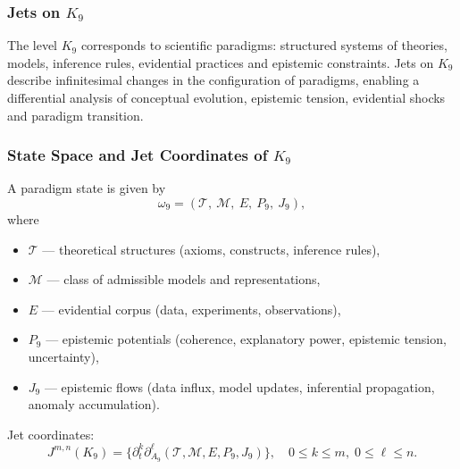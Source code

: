 
\subsubsection{Jets on \texorpdfstring{$K_9$}{K_9}}
\label{sec:jets-k9}

The level $K_9$ corresponds to scientific paradigms: structured systems
of theories, models, inference rules, evidential practices and epistemic
constraints. Jets on $K_9$ describe infinitesimal changes in the
configuration of paradigms, enabling a differential analysis of
conceptual evolution, epistemic tension, evidential shocks and paradigm
transition.


\subsubsection{State Space and Jet Coordinates of \texorpdfstring{$K_9$}{K_9}}

A paradigm state is given by
\[
\omega_9 = 
(\mathcal{T},\ \mathcal{M},\ E,\ P_9,\ J_9),
\]
where
\begin{itemize}
    \item $\mathcal{T}$ — theoretical structures (axioms, constructs, 
          inference rules),
    \item $\mathcal{M}$ — class of admissible models and representations,
    \item $E$ — evidential corpus (data, experiments, observations),
    \item $P_9$ — epistemic potentials (coherence, explanatory power,
          epistemic tension, uncertainty),
    \item $J_9$ — epistemic flows (data influx, model updates,
          inferential propagation, anomaly accumulation).
\end{itemize}

Jet coordinates:
\[
J^{m,n}(K_9)
=
\{\partial_t^k \partial_{A_9}^\ell 
(\mathcal{T},\mathcal{M},E,P_9,J_9)
\},
\quad
0\le k\le m,\;
0\le\ell\le n.
\]


